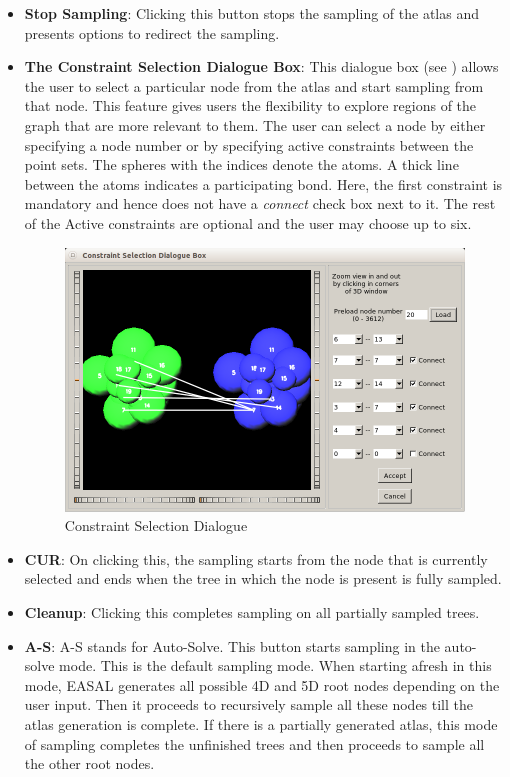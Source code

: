 \documentclass[10pt]{article}
\begin{document}
\begin{itemize}
\item \textbf{Stop Sampling}: Clicking this button stops the sampling of the
atlas and presents options to redirect the sampling.

\item \textbf{The Constraint Selection Dialogue Box}: This dialogue box (see
) allows the user to select a particular node from the atlas and
start sampling from that node. This feature gives users the flexibility to
explore regions of the graph that are more relevant to them. The user can
select a node by either specifying a node number or by specifying active
constraints between the point sets. The spheres with the indices denote the
atoms. A thick line between the atoms indicates a participating bond.  Here,
the first constraint is mandatory and hence does not have a \emph{connect}
check box next to it. The rest of the Active constraints are optional and the
user may choose up to six.
\begin{figure} 
\centering 
\includegraphics[scale=0.5]{fig/DumbbellSelection.png} 
\caption{Constraint Selection Dialogue} 
\label{CSD} 
\end{figure}

\item \textbf{CUR}: On clicking this, the sampling starts from the node that is
currently selected and ends when the tree in which the node is present is fully
sampled.

\item \textbf{Cleanup}: Clicking this completes sampling on all partially
sampled trees.

\item \textbf{A-S}: A-S stands for Auto-Solve. This button starts sampling in
the auto-solve mode. This is the default sampling mode. When starting afresh in
this mode, EASAL generates all possible 4D and 5D root nodes depending on the
user input. Then it proceeds to recursively sample all these nodes till the
atlas generation is complete. If there is a partially generated atlas, this
mode of sampling completes	 the unfinished trees and then proceeds to
sample all the other root nodes.


\end{itemize}
\end{document}
